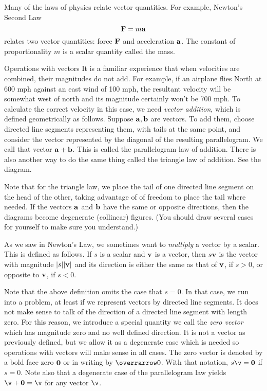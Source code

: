 Many of the laws of physics relate vector quantities.  For example,
Newton's Second Law
$$
        \bold F = m\bold a
$$
relates two vector quantities:  force $\bold F$ and acceleration
$\bold a$.  The constant of proportionality $m$ is a scalar quantity
called the mass.


\subhead Operations with vectors \endsubhead
It is a familiar experience that when velocities are combined, their
magnitudes do not add.  For example, if an airplane flies North
at 600 mph against  an east  wind of 100 mph,  the resultant  velocity
will be somewhat west of north and its magnitude certainly won't
be 700 mph.  To calculate the correct velocity in this case, we need
{\it vector addition\/}, which is defined geometrically as follows.
Suppose  $\bold a, \bold b$ are vectors.  To add them, choose directed line
%
%
segments representing them, with tails at the same point, and consider
the vector represented by the diagonal of the resulting parallelogram.
We call that vector $\bold a + \bold b$.  This is called the parallelogram
law of addition.   There is also another way to do the same thing
called the triangle law of addition.  See the diagram.
\medskip
\centerline{}
\medskip
Note that for the triangle law, we place the tail of one directed
line segment on the head of the other, taking advantage of of freedom
to place the tail where needed.  If the vectors $\bold a$ and $\bold b$
have the same or opposite directions, then the diagrams become degenerate
(collinear) figures.   (You should draw several cases for yourself to
make sure you understand.)

As we saw in Newton's Law, we sometimes want to {\it multiply\/}
a vector by a scalar.  This is defined as follows.  If $s$ is a scalar
and $\bold v$ is a vector, then $s\bold v$ is the vector with magnitude
$|s||\bold v|$ and its direction is either the same as that of $\bold v$,
if $s > 0$, or opposite to $\bold v$, if $s < 0$.

Note that the above definition omits the case that $s = 0$.  In that
case, we run into a problem, at least if we represent vectors by directed
line
segments.  It does not make sense to talk of the direction of a
directed line segment with length zero.  For this reason, we introduce
a special quantity we call the {\it zero vector\/} which has
magnitude zero and no well defined direction.  It is not 
a vector as previously defined, but we allow it as
a degenerate case which is needed so operations with vectors will make
sense in all cases.  
 The zero vector is denoted by a bold face zero
%
$\bold 0$ or in writing by $\overrarrow 0$.  With that notation,
$s\v = \bold 0$ if $s = 0$.  Note also that a degenerate
case of the parallelogram law yields $\v + \bold 0 = \v$ for
any vector $\v$.

